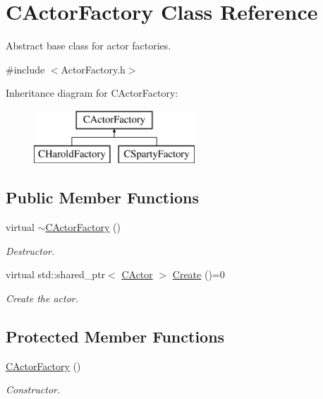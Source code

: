\hypertarget{class_c_actor_factory}{\section{C\+Actor\+Factory Class Reference}
\label{class_c_actor_factory}
}


Abstract base class for actor factories.  




{\ttfamily \#include $<$Actor\+Factory.\+h$>$}

Inheritance diagram for C\+Actor\+Factory\+:\begin{figure}[H]
\begin{center}
\leavevmode
\includegraphics[height=2.000000cm]{class_c_actor_factory}
\end{center}
\end{figure}
\subsection*{Public Member Functions}
\begin{DoxyCompactItemize}
\item 
\hypertarget{class_c_actor_factory_a2c3174c6ca0362dbd3dbd2f599a51c46}{virtual \hyperlink{class_c_actor_factory_a2c3174c6ca0362dbd3dbd2f599a51c46}{$\sim$\+C\+Actor\+Factory} ()}\label{class_c_actor_factory_a2c3174c6ca0362dbd3dbd2f599a51c46}

\begin{DoxyCompactList}\small\item\em Destructor. \end{DoxyCompactList}\item 
virtual std\+::shared\+\_\+ptr$<$ \hyperlink{class_c_actor}{C\+Actor} $>$ \hyperlink{class_c_actor_factory_a1e751d97cc015ab2182b7683133e5a5d}{Create} ()=0
\begin{DoxyCompactList}\small\item\em Create the actor. \end{DoxyCompactList}\end{DoxyCompactItemize}
\subsection*{Protected Member Functions}
\begin{DoxyCompactItemize}
\item 
\hypertarget{class_c_actor_factory_a6a9d84ffa74ef0b01bf1e31fb28efcaa}{\hyperlink{class_c_actor_factory_a6a9d84ffa74ef0b01bf1e31fb28efcaa}{C\+Actor\+Factory} ()}\label{class_c_actor_factory_a6a9d84ffa74ef0b01bf1e31fb28efcaa}

\begin{DoxyCompactList}\small\item\em Constructor. \end{DoxyCompactList}\end{DoxyCompactItemize}


